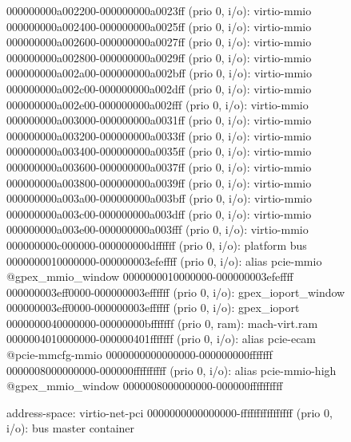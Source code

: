 \begin{figure} [ht]
\begin{ffcode}
        000000000a002200-000000000a0023ff (prio 0, i/o): virtio-mmio
        000000000a002400-000000000a0025ff (prio 0, i/o): virtio-mmio
        000000000a002600-000000000a0027ff (prio 0, i/o): virtio-mmio
        000000000a002800-000000000a0029ff (prio 0, i/o): virtio-mmio
        000000000a002a00-000000000a002bff (prio 0, i/o): virtio-mmio
        000000000a002c00-000000000a002dff (prio 0, i/o): virtio-mmio
        000000000a002e00-000000000a002fff (prio 0, i/o): virtio-mmio
        000000000a003000-000000000a0031ff (prio 0, i/o): virtio-mmio
        000000000a003200-000000000a0033ff (prio 0, i/o): virtio-mmio
        000000000a003400-000000000a0035ff (prio 0, i/o): virtio-mmio
        000000000a003600-000000000a0037ff (prio 0, i/o): virtio-mmio
        000000000a003800-000000000a0039ff (prio 0, i/o): virtio-mmio
        000000000a003a00-000000000a003bff (prio 0, i/o): virtio-mmio
        000000000a003c00-000000000a003dff (prio 0, i/o): virtio-mmio
        000000000a003e00-000000000a003fff (prio 0, i/o): virtio-mmio
        000000000c000000-000000000dffffff (prio 0, i/o): platform bus
        0000000010000000-000000003efeffff (prio 0, i/o): alias pcie-mmio @gpex_mmio_window 0000000010000000-000000003efeffff
        000000003eff0000-000000003effffff (prio 0, i/o): gpex_ioport_window
          000000003eff0000-000000003effffff (prio 0, i/o): gpex_ioport
        0000000040000000-00000000bfffffff (prio 0, ram): mach-virt.ram
        0000004010000000-000000401fffffff (prio 0, i/o): alias pcie-ecam @pcie-mmcfg-mmio 0000000000000000-000000000fffffff
        0000008000000000-000000ffffffffff (prio 0, i/o): alias pcie-mmio-high @gpex_mmio_window 0000008000000000-000000ffffffffff

    address-space: virtio-net-pci
      0000000000000000-ffffffffffffffff (prio 0, i/o): bus master container


\end{ffcode}
\end{figure}

